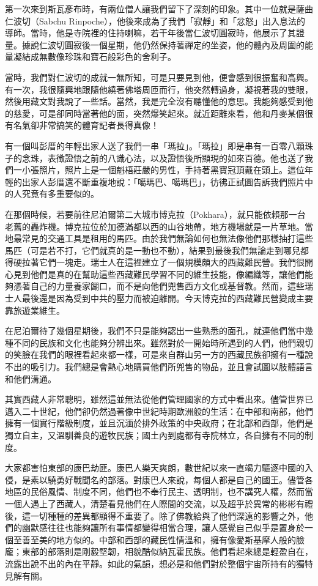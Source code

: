 第一次來到斯瓦彥布時，有兩位僧人讓我們留下了深刻的印象。其中一位就是薩曲仁波切（Sabchu
Rinpoche），他後來成為了我們「寂靜」和「忿怒」出入息法的導師。當時，他是寺院裡的住持喇嘛，若干年後當仁波切圓寂時，他展示了其證量。據說仁波切圓寂後一個星期，他仍然保持著禪定的坐姿，他的體內及周圍的能量凝結成無數像珍珠和寶石般彩色的舍利子。

當時，我們對仁波切的成就一無所知，可是只要見到他，便會感到很振奮和高興。有一次，我很隨興地跟隨他繞著佛塔周匝而行，他突然轉過身，凝視著我的雙眼，然後用藏文對我說了一些話。當然，我是完全沒有聽懂他的意思。我能夠感受到他的慈愛，可是卻同時當著他的面，突然爆笑起來。就近距離來看，他和丹麥某個很有名氣卻非常搞笑的體育記者長得真像！

有一個叫彭厝的年輕出家人送了我們一串「瑪拉」。「瑪拉」即是串有一百零八顆珠子的念珠，表徵證悟之前的八識心法，以及證悟後所顯現的如來百德。他也送了我們一小張照片，照片上是一個魁梧莊嚴的男性，手持著黑寶冠頂戴在頭上。這位年輕的出家人彭厝還不斷重複地說：「噶瑪巴、噶瑪巴」，彷彿正試圖告訴我們照片中的人究竟有多重要似的。


在那個時候，若要前往尼泊爾第二大城市博克拉（Pokhara），就只能依賴那一台老舊的轟炸機。博克拉位於加德滿都以西的山谷地帶，地方機場就是一片草地。當地最常見的交通工具是租用的馬匹。由於我們無論如何也無法像他們那樣抽打這些馬匹（可是若不打，它們就真的是一動也不動），結果到最後我們無論走到哪兒都得硬拉著它們一塊走。瑞士人在這裡建立了一個規模頗大的西藏難民營。我們很開心見到他們是真的在幫助這些西藏難民學習不同的維生技能，像編織等，讓他們能夠憑著自己的力量養家餬口，而不是向他們兜售西方文化或基督教。然而，這些瑞士人最後還是因為受到中共的壓力而被迫離開。今天博克拉的西藏難民營變成主要靠旅遊業維生。

在尼泊爾待了幾個星期後，我們不只是能夠認出一些熟悉的面孔，就連他們當中幾種不同的民族和文化也能夠分辨出來。雖然對於一開始時所遇到的人們，他們親切的笑臉在我們的眼裡看起來都一樣，可是來自群山另一方的西藏民族卻擁有一種說不出的吸引力。我們總是會熱心地購買他們所兜售的物品，並且會試圖以肢體語言和他們溝通。

其實西藏人非常聰明，雖然這並無法從他們管理國家的方式中看出來。儘管世界已邁入二十世紀，他們卻仍然過著像中世紀時期歐洲般的生活：在中部和南部，他們擁有一個實行階級制度，並且沉湎於排外政策的中央政府；在北部和西部，他們是獨立自主，又溫馴善良的遊牧民族；國土內到處都有寺院林立，各自擁有不同的制度。

大家都害怕東部的康巴劫匪。康巴人樂天爽朗，數世紀以來一直竭力驅逐中國的入侵，是素以驍勇好戰聞名的部落。對康巴人來說，每個人都是自己的國王。儘管各地區的民俗風情、制度不同，他們也不奉行民主、透明制，也不講究人權，然而當一個人遇上了西藏人，清楚看見他們在人際間的交流，以及超乎於異常的彬彬有禮後，這一切種種的差異都顯得不重要了。除了佛教給與了他們深遠的影響之外，他們的幽默感往往也能夠讓所有事情都變得相當合理，讓人感覺自己似乎是置身於一個至善至美的地方似的。中部和西部的藏民性情溫和，擁有像愛斯基摩人般的臉龐；東部的部落則是剛毅堅韌，相貌酷似納瓦霍民族。他們看起來總是輕盈自在，流露出說不出的內在平靜。如此的氣韻，想必是和他們對於整個宇宙所持有的獨特見解有關。

